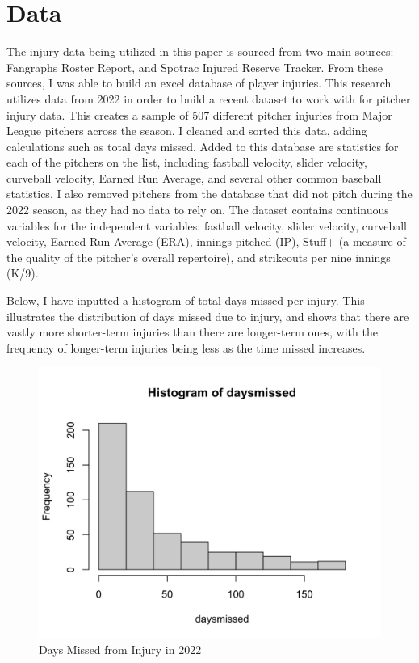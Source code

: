 \documentclass{article}
\begin{document}
\section{Data}
The injury data being utilized in this paper is sourced from two main sources: Fangraphs Roster Report, and Spotrac Injured Reserve Tracker. From these sources, I was able to build an excel database of player injuries. This research utilizes data from 2022 in order to build a recent dataset to work with for pitcher injury data. This creates a sample of 507 different pitcher injuries from Major League pitchers across the season. I cleaned and sorted this data, adding calculations such as total days missed. Added to this database are statistics for each of the pitchers on the list, including fastball velocity, slider velocity, curveball velocity, Earned Run Average, and several other common baseball statistics. I also removed pitchers from the database that did not pitch during the 2022 season, as they had no data to rely on. The dataset contains continuous variables for the independent variables: fastball velocity, slider velocity, curveball velocity, Earned Run Average (ERA), innings pitched (IP), Stuff+ (a measure of the quality of the pitcher's overall repertoire), and strikeouts per nine innings (K/9). 

Below, I have inputted a histogram of total days missed per injury. This illustrates the distribution of days missed due to injury, and shows that there are vastly more shorter-term injuries than there are longer-term ones, with the frequency of longer-term injuries being less as the time missed increases.

\begin{figure}[H]
  \centering
  \includegraphics[scale=0.25]{histdaysmissed.png}
  \caption{Days Missed from Injury in 2022}
  \label{fig:Fig1}
\end{figure}
\end{document}
